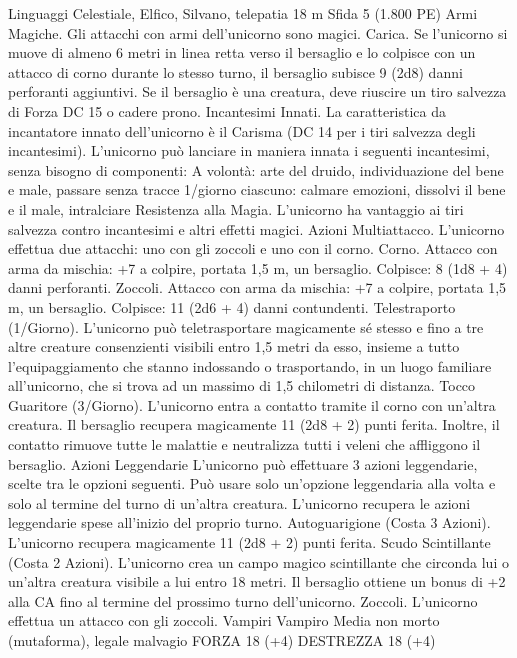 \begin{multicols}{2}
Linguaggi Celestiale, Elfico, Silvano, telepatia 18 m
Sfida 5 (1.800 PE)
Armi Magiche. Gli attacchi con armi dell’unicorno sono magici.
Carica. Se l’unicorno si muove di almeno 6 metri in linea retta
verso il bersaglio e lo colpisce con un attacco di corno durante lo
stesso turno, il bersaglio subisce 9 (2d8) danni perforanti
aggiuntivi. Se il bersaglio è una creatura, deve riuscire un tiro
salvezza di Forza DC 15 o cadere prono.
Incantesimi Innati. La caratteristica da incantatore innato
dell’unicorno è il Carisma (DC 14 per i tiri salvezza degli
incantesimi). L’unicorno può lanciare in maniera innata i
seguenti incantesimi, senza bisogno di componenti:
A volontà: arte del druido, individuazione del bene e male,
passare senza tracce
1/giorno ciascuno: calmare emozioni, dissolvi il bene e il male,
intralciare
Resistenza alla Magia. L’unicorno ha vantaggio ai tiri salvezza
contro incantesimi e altri effetti magici.
Azioni
Multiattacco. L’unicorno effettua due attacchi: uno con gli
zoccoli e uno con il corno.
Corno. Attacco con arma da mischia: +7 a colpire, portata 1,5 m,
un bersaglio.
Colpisce: 8 (1d8 + 4) danni perforanti.
Zoccoli. Attacco con arma da mischia: +7 a colpire, portata 1,5
m, un bersaglio.
Colpisce: 11 (2d6 + 4) danni contundenti.
Telestraporto (1/Giorno). L’unicorno può teletrasportare
magicamente sé stesso e fino a tre altre creature consenzienti
visibili entro 1,5 metri da esso, insieme a tutto
l’equipaggiamento che stanno indossando o trasportando, in un
luogo familiare all’unicorno, che si trova ad un massimo di 1,5
chilometri di distanza.
Tocco Guaritore (3/Giorno). L’unicorno entra a contatto tramite
il corno con un’altra creatura. Il bersaglio recupera magicamente
11 (2d8 + 2) punti ferita. Inoltre, il contatto rimuove tutte le
malattie e neutralizza tutti i veleni che affliggono il bersaglio.
Azioni Leggendarie
L’unicorno può effettuare 3 azioni leggendarie, scelte tra le
opzioni seguenti. Può usare solo un’opzione leggendaria alla
volta e solo al termine del turno di un’altra creatura. L’unicorno
recupera le azioni leggendarie spese all’inizio del proprio turno.
Autoguarigione (Costa 3 Azioni). L’unicorno recupera
magicamente 11 (2d8 + 2) punti ferita.
Scudo Scintillante (Costa 2 Azioni). L’unicorno crea un campo
magico scintillante che circonda lui o un’altra creatura visibile a lui
entro 18 metri. Il bersaglio ottiene un bonus di +2 alla CA fino al
termine del prossimo turno dell’unicorno.
Zoccoli. L’unicorno effettua un attacco con gli zoccoli.
Vampiri
Vampiro
Media non morto (mutaforma), legale malvagio
FORZA 18 (+4)
DESTREZZA 18 (+4)

\end{multicols}
